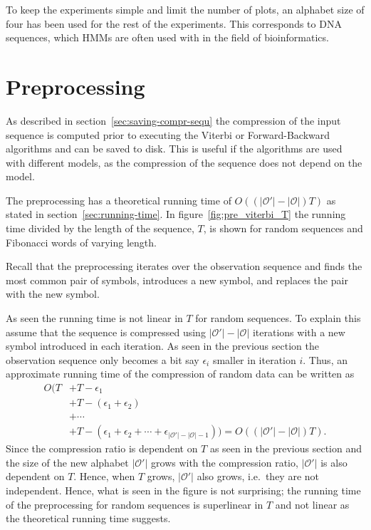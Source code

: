 To keep the experiments simple and limit the number of plots, an alphabet
size of four has been used for the rest of the experiments. This corresponds
to DNA sequences, which HMMs are often used with in the field of bioinformatics.

\section{Preprocessing}

As described in section~\ref{sec:saving-compr-sequ} the compression of the
input sequence is computed prior to executing the Viterbi or Forward-Backward
algorithms and can be saved to disk. This is useful if the algorithms are used with different
models, as the compression of the sequence does not depend on the model.

The preprocessing has a theoretical running time of
$O(( \lvert\mathcal{O'}\rvert - \lvert{\mathcal{O}}\rvert) T)$ as stated in
section~\ref{sec:running-time}. In figure~\ref{fig:pre_viterbi_T} the running
time divided by the length of the sequence, $T$, is shown for random sequences
and Fibonacci words of varying length.

Recall that the preprocessing iterates over the observation sequence and finds
the most common pair of symbols, introduces a new symbol, and replaces the pair
with the new symbol.

As seen the running time is not linear in $T$ for random sequences. To explain
this assume that the sequence is compressed using
$\lvert\mathcal{O'}\rvert - \lvert{\mathcal{O}}\rvert$ iterations with a new
symbol introduced in each iteration. As seen in the previous section the
observation sequence only becomes a bit say $\epsilon_i$ smaller in iteration
$i$. Thus, an approximate running time of the compression of random data can be
written as
\begin{equation*}
  \begin{aligned}
    O(T & + T - \epsilon_1                \\
        & + T - (\epsilon_1 + \epsilon_2) \\
        & + \cdots                        \\
        & + T -(\epsilon_1 + \epsilon_2 + \cdots + \epsilon_{\lvert\mathcal{O'}\rvert - \lvert{\mathcal{O}}\rvert - 1})) = O\left((\lvert\mathcal{O'}\rvert - \lvert{\mathcal{O}}\rvert) T \right) .
  \end{aligned}
\end{equation*}
Since the compression ratio is dependent on $T$ as seen in the previous section
and the size of the new alphabet $\lvert\mathcal{O'}\rvert$ grows with the
compression ratio, $\lvert\mathcal{O'}\rvert$ is also dependent on $T$. Hence,
when $T$ grows, $\lvert\mathcal{O'}\rvert$ also grows, i.e.\ they are not
independent. Hence, what is seen in the figure is not surprising; the running
time of the preprocessing for random sequences is superlinear in $T$ and not
linear as the theoretical running time suggests.


